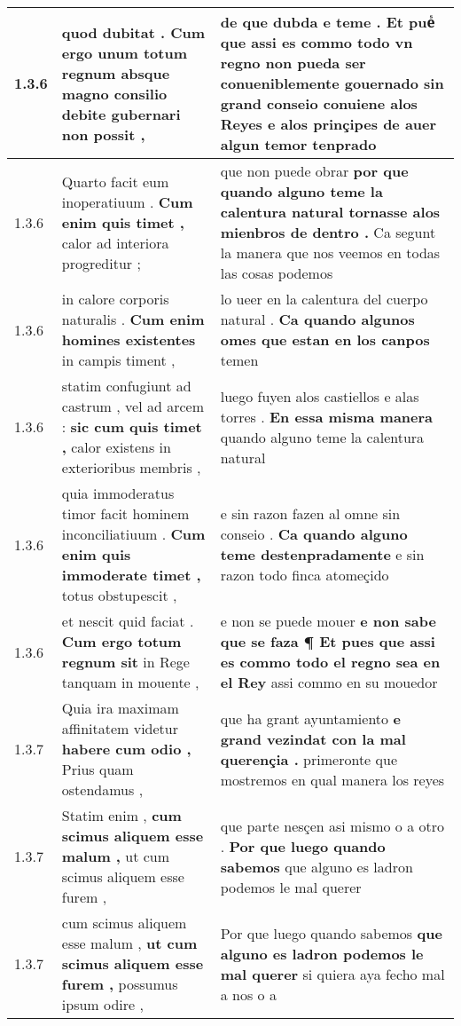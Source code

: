\begin{tabular}{|p{1cm}|p{6.5cm}|p{6.5cm}|}
1.3.6 & quod dubitat . \textbf{ Cum ergo unum totum regnum } absque magno consilio debite gubernari non possit , & de que dubda e teme . \textbf{ Et pueᷤ que assi es commo todo vn regno non pueda ser conueniblemente gouernado sin grand conseio } conuiene alos Reyes e alos prinçipes de auer algun temor tenprado \\\hline
1.3.6 & Quarto facit eum inoperatiuum . \textbf{ Cum enim quis timet , } calor ad interiora progreditur ; & que non puede obrar \textbf{ por que quando alguno teme la calentura natural tornasse alos mienbros de dentro . } Ca segunt la manera que nos veemos en todas las cosas podemos \\\hline
1.3.6 & in calore corporis naturalis . \textbf{ Cum enim homines existentes } in campis timent , & lo ueer en la calentura del cuerpo natural . \textbf{ Ca quando algunos omes que estan en los canpos } temen \\\hline
1.3.6 & statim confugiunt ad castrum , vel ad arcem : \textbf{ sic cum quis timet , } calor existens in exterioribus membris , & luego fuyen alos castiellos e alas torres . \textbf{ En essa misma manera } quando alguno teme la calentura natural \\\hline
1.3.6 & quia immoderatus timor facit hominem inconciliatiuum . \textbf{ Cum enim quis immoderate timet , } totus obstupescit , & e sin razon fazen al omne sin conseio . \textbf{ Ca quando alguno teme destenpradamente } e sin razon todo finca atomeçido \\\hline
1.3.6 & et nescit quid faciat . \textbf{ Cum ergo totum regnum sit } in Rege tanquam in mouente , & e non se puede mouer \textbf{ e non sabe que se faza ¶ Et pues que assi es commo todo el regno sea en el Rey } assi commo en su mouedor \\\hline
1.3.7 & Quia ira maximam affinitatem videtur \textbf{ habere cum odio , } Prius quam ostendamus , & que ha grant ayuntamiento \textbf{ e grand vezindat con la mal querençia . } primeronte que mostremos en qual manera los reyes \\\hline
1.3.7 & Statim enim , \textbf{ cum scimus aliquem esse malum , } ut cum scimus aliquem esse furem , & que parte nesçen asi mismo o a otro . \textbf{ Por que luego quando sabemos } que alguno es ladron podemos le mal querer \\\hline
1.3.7 & cum scimus aliquem esse malum , \textbf{ ut cum scimus aliquem esse furem , } possumus ipsum odire , & Por que luego quando sabemos \textbf{ que alguno es ladron podemos le mal querer } si quiera aya fecho mal a nos o a \\\hline

\end{tabular}

